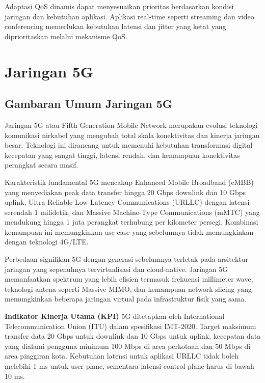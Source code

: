 Adaptasi QoS dinamis dapat menyesuaikan prioritas berdasarkan kondisi jaringan dan kebutuhan aplikasi. Aplikasi real-time seperti streaming dan video conferencing memerlukan kebutuhan latensi dan jitter yang ketat yang diprioritaskan melalui mekanisme QoS.

\section{Jaringan 5G}

\subsection{Gambaran Umum Jaringan 5G}

Jaringan 5G atau Fifth Generation Mobile Network merupakan evolusi teknologi komunikasi nirkabel yang mengubah total skala konektivitas dan kinerja jaringan besar. Teknologi ini dirancang untuk memenuhi kebutuhan transformasi digital kecepatan yang sangat tinggi, latensi rendah, dan kemampuan konektivitas perangkat secara masif.


Karakteristik fundamental 5G mencakup Enhanced Mobile Broadband (eMBB) yang menyediakan peak data transfer hingga 20 Gbps downlink dan 10 Gbps uplink, Ultra-Reliable Low-Latency Communications (URLLC) dengan latensi serendah 1 milidetik, dan Massive Machine-Type Communications (mMTC) yang mendukung hingga 1 juta perangkat terhubung per kilometer persegi. Kombinasi kemampuan ini memungkinkan use case  yang sebelumnya tidak memungkinkan dengan teknologi 4G/LTE.

Perbedaan signifikan 5G dengan generasi sebelumnya terletak pada arsitektur jaringan yang sepenuhnya tervirtualisasi dan cloud-native. Jaringan 5G memanfaatkan spektrum yang lebih efisien termasuk frekuensi millimeter wave, teknologi antena seperti Massive MIMO, dan kemampuan network slicing yang memungkinkan beberapa jaringan virtual pada infrastruktur fisik yang sama.

\textbf{Indikator Kinerja Utama (KPI)} 5G ditetapkan oleh International Telecommunication Union (ITU) dalam spesifikasi IMT-2020. Target maksimum transfer data 20 Gbps untuk downlink dan 10 Gbps untuk uplink, kecepatan data yang dialami pengguna minimum 100 Mbps di area perkotaan dan 50 Mbps di area pinggiran kota. Kebutuhan latensi untuk aplikasi URLLC tidak boleh melebihi 1 ms untuk user plane, sementara latensi control plane harus di bawah 10 ms.

